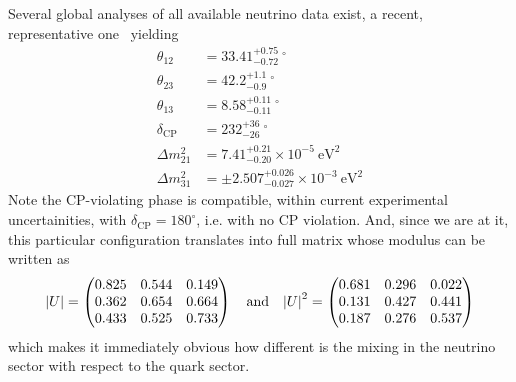 Several global analyses of all available neutrino data exist, a recent, representative
one~\cite{2020JHEP...09..178E} yielding
\begin{align}
  \theta_{12} & = 33.41^{+0.75}_{-0.72}~^\circ \nonumber\\
  \theta_{23} & = 42.2^{+1.1}_{-0.9}~^\circ \nonumber\\
  \theta_{13} & = 8.58^{+0.11}_{-0.11}~^\circ \nonumber\\
  \delta_\text{CP} & = 232^{+36}_{-26}~^\circ \nonumber\\
  \Delta m^2_{21} & = 7.41^{+0.21}_{-0.20} \times 10^{-5}~\text{eV}^2 \nonumber\\
  \Delta m^2_{31} & = \pm 2.507^{+0.026}_{-0.027} \times 10^{-3}~\text{eV}^2
\end{align}
Note the CP-violating phase is compatible, within current experimental uncertainities,
with $\delta_\text{CP} = 180^\circ$, i.e. with no CP violation. And, since we are at it,
this particular configuration translates into full matrix whose modulus can be written as
\begin{align*}
  \abs{U} =
  \begin{pmatrix}
    0.825 & 0.544 & 0.149\\
    0.362 & 0.654 & 0.664\\
    0.433 & 0.525 & 0.733\\
  \end{pmatrix}
  \quad\text{and}\quad
  \abs{U}^2 =
  \begin{pmatrix}
    0.681 & 0.296 & 0.022\\
    0.131 & 0.427 & 0.441\\
    0.187 & 0.276 & 0.537\\
  \end{pmatrix}
\end{align*}
which makes it immediately obvious how different is the mixing in the neutrino
sector with respect to the quark sector.
